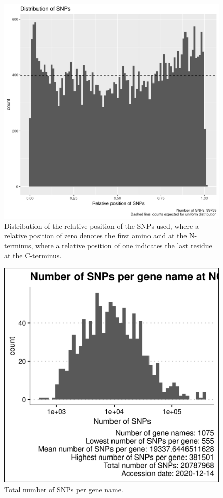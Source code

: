 \begin{figure}[!htbp]
  \includegraphics[width=\textwidth]{ncbi_peregrine_results/fig_snp_rel_pos.png}
  \caption{
    Distribution of the relative position of the SNPs used,
    where a relative position of zero denotes the first amino
    acid at the N-terminus, where a relative position of one
    indicates the last residue at the C-terminus.
  }
  \label{fig:snp_rel_pos}
\end{figure}

\begin{figure}[!htbp]
  \includegraphics[width=\textwidth]{ncbi_peregrine_results/fig_snps_per_gene_name_ncbi.png}
  \caption{
    Total number of SNPs per gene name.
  }
  \label{fig:snps_per_gene_name_ncbi}
\end{figure}


